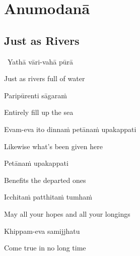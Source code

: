 
\chapter{Anumodanā}
\clearpage

\section{Just as Rivers}
\label{just-as-rivers}

\anglebracketleft\ \hspace{-0.5mm}Yathā vāri-vahā pūrā \hspace{-0.5mm}\anglebracketright\

\begin{english}
  Just as rivers full of water
\end{english}

Paripūrenti sāgaraṁ

\begin{english}
  Entirely fill up the sea
\end{english}

Evam-eva ito dinnaṁ petānaṁ upakappati

\begin{english}
  Likewise what's been given here\hyperlink{endnote114-appendix}{\hypertarget{endnote114-body}{}}
\end{english}

Petānaṁ upakappati

\begin{english}
  Benefits the departed ones\hyperlink{endnote115-appendix}{\hypertarget{endnote115-body}{}}
\end{english}


Icchitaṁ patthitaṁ tumhaṁ

\begin{english}
  May all your hopes and all your longings
\end{english}

Khippam-eva samijjhatu

\begin{english}
  Come true in no long time
\end{english}

